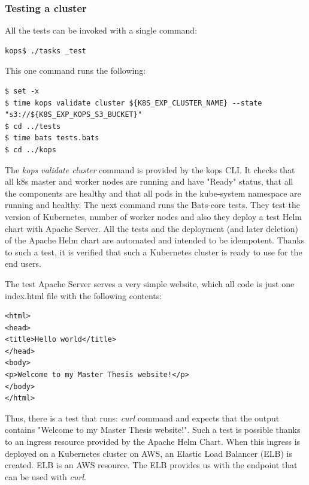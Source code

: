 \subsubsection{Testing a cluster}
\label{kops-testing}
All the tests can be invoked with a single command:
\begin{lstlisting}[basicstyle=\tiny,caption={Testing a kops cluster}]
kops$ ./tasks _test
\end{lstlisting}

This one command runs the following:
\begin{lstlisting}[basicstyle=\tiny,caption={Testing a kops cluster - deeper dive}]
$ set -x
$ time kops validate cluster ${K8S_EXP_CLUSTER_NAME} --state "s3://${K8S_EXP_KOPS_S3_BUCKET}"
$ cd ../tests
$ time bats tests.bats
$ cd ../kops
\end{lstlisting}

The \textit{kops validate cluster} command is provided by the kops CLI. It checks that all k8s master and worker nodes are running and have "Ready" status, that all the components are healthy and that all pods in the kube-system namespace are running and healthy\cite{online-kops-valid}. The next command runs the Bats-core tests. They test the version of Kubernetes, number of worker nodes and also they deploy a test Helm chart with Apache Server. All the tests and the deployment (and later deletion) of the Apache Helm chart are automated and intended to be idempotent. Thanks to such a test, it is verified that such a Kubernetes cluster is ready to use for the end users.

The test Apache Server serves a very simple website, which all code is just one index.html file with the following contents:
\begin{lstlisting}[basicstyle=\tiny,caption={Contents of a test application - Apache web server}]
<html>
<head>
<title>Hello world</title>
</head>
<body>
<p>Welcome to my Master Thesis website!</p>
</body>
</html>
\end{lstlisting}
Thus, there is a test that runs: \textit{curl} command and expects that the output contains "Welcome to my Master Thesis website!". Such a test is possible thanks to an ingress resource provided by the Apache Helm Chart. When this ingress is deployed on a Kubernetes cluster on AWS, an Elastic Load Balancer (ELB) is created. ELB is an AWS resource. The ELB provides us with the endpoint that can be used with \textit{curl}.

